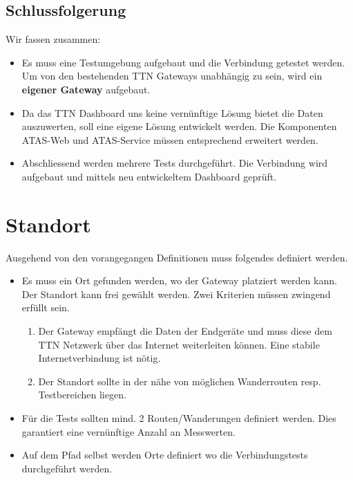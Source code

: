 \documentclass[11pt,english,german]{report}
\theoremstyle{definition}
\begin{document}
\subsection{Schlussfolgerung}
Wir fassen zusammen:
\begin{itemize}
	\item
	Es muss eine Testumgebung aufgebaut und die Verbindung getestet werden. Um von den bestehenden TTN Gateways unabhängig zu sein, wird ein \textbf{eigener Gateway} aufgebaut.
	\item 
	Da das TTN Dashboard uns keine vernünftige Lösung bietet die Daten auszuwerten, soll eine eigene Lösung entwickelt werden. Die Komponenten ATAS-Web und ATAS-Service müssen entsprechend erweitert werden.
	\item Abschliessend werden mehrere Tests durchgeführt. Die Verbindung wird aufgebaut und mittels neu entwickeltem Dashboard geprüft.
\end{itemize}

\newpage
\section{Standort}
Ausgehend von den vorangegangen Definitionen muss folgendes definiert werden.
\begin{itemize}
	\item Es muss ein Ort gefunden werden, wo der Gateway platziert werden kann.\\[0.3cm]
	Der Standort kann frei gewählt werden. Zwei Kriterien müssen zwingend erfüllt sein. 
	\begin{enumerate}
		\item
		Der Gateway empfängt die Daten der Endgeräte und muss diese dem TTN Netzwerk über das Internet weiterleiten können. Eine stabile Internetverbindung ist nötig. 
		\item 
		Der Standort sollte in der nähe von möglichen Wanderrouten resp. Testbereichen liegen.
	\end{enumerate}
	\item Für die Tests sollten mind. 2 Routen/Wanderungen definiert werden. Dies garantiert eine vernünftige Anzahl an Messwerten.
	\item Auf dem Pfad selbst werden Orte definiert wo die Verbindungstests durchgeführt werden.
\end{itemize}

\newpage
\end{document}
